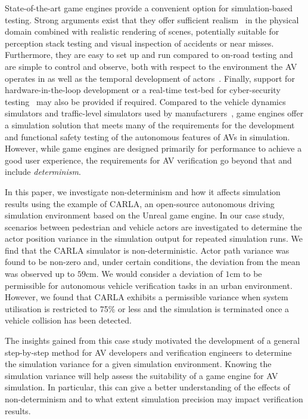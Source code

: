 State-of-the-art game engines provide a convenient option for simulation-based testing. Strong arguments exist that they offer sufficient realism~\cite{Koopman2018} in the physical domain combined with realistic rendering of scenes, potentially suitable for perception stack testing and visual inspection of accidents or near misses. 
%
Furthermore, they are easy to set up and run compared to on-road testing and are simple to control and observe, both with respect to the environment the AV operates in as well as the temporal development of actors~\cite{Ulbrich2015}. 
%
Finally, support for hardware-in-the-loop development or a real-time test-bed for cyber-security testing~\cite{Javaid2013} may also be provided if required. 
%
Compared to the vehicle dynamics simulators and traffic-level simulators used by manufacturers~\cite{FrameworkAndChallenges}, game engines offer a simulation solution that meets many of the requirements for the development and functional safety testing of the autonomous features of AVs in simulation. 
%
However, while game engines are designed primarily for performance to achieve a good user experience, the requirements for AV verification go beyond that and include \textit{determinism}.

In this paper, we investigate non-determinism and how it affects simulation results using the example of CARLA, an open-source autonomous driving simulation environment based on the Unreal game engine.
%
In our case study, scenarios between pedestrian and vehicle actors are investigated to determine the actor position variance in the simulation output for repeated simulation runs. We find that the CARLA simulator is non-deterministic. Actor path variance was found to be non-zero and, under certain conditions, the deviation from the mean was observed up to $59$cm. We would consider a deviation of $1$cm to be permissible for autonomous vehicle verification tasks in an urban environment. However, we found that CARLA exhibits a permissible variance when system utilisation is restricted to 75\% or less and the simulation is terminated once a vehicle collision has been detected. 
%

The insights gained from this case study motivated the development of a general step-by-step method for AV developers and verification engineers to determine the simulation variance for a given simulation environment. 
%
Knowing the simulation variance will help assess the suitability of a game engine for AV simulation. In particular, this can give a better understanding of the effects of non-determinism and to what extent simulation precision may impact verification results.
%

